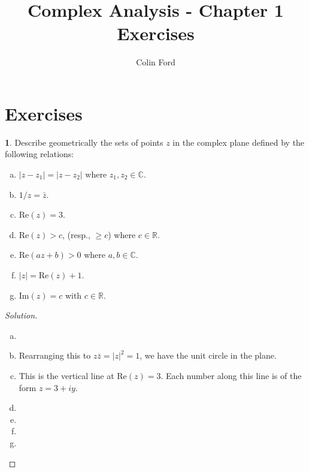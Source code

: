 \documentclass[12pt,a4]{article}
\author{Colin Ford}
\title{Complex Analysis - Chapter 1 Exercises}
\date{}
\theoremstyle{definition}
\newtheorem{exercise}{}
\renewcommand{\Re}{\text{Re}}
\renewcommand{\Im}{\text{Im}}
\newcommand{\C}{\mathbb{C}}
\newcommand{\R}{\mathbb{R}}
\begin{document}
\maketitle

\section*{Exercises}

\begin{exercise}
	Describe geometrically the sets of points $z$ in the complex plane defined by the following relations:
	
	\begin{enumerate}[(a)]
		\item $|z - z_1| = |z - z_2|$ where $z_1, z_2 \in \C$. 
		
		\item $1 / z = \bar{z}$. 
		
		\item $\Re(z) = 3$. 
		
		\item $\Re(z) > c$, (resp., $\geq c$) where $c \in \R$. 
		
		\item $\Re(a z + b) > 0$ where $a, b \in \C$. 
		
		\item $|z| = \Re(z) + 1$. 
		
		\item $\Im(z) = c$ with $c \in \R$.
	\end{enumerate}
\end{exercise}
\begin{proof}[Solution]
	\begin{enumerate}[(a)]
		\item 
		
		\item Rearranging this to $z \bar{z} = |z|^2 = 1$, we have the unit circle in the plane. 
		
		\item This is the vertical line at $\Re(z) = 3$. Each number along this line is of the form $z = 3 + i y$.
		
		\item 
		
		\item 
		
		\item 
		
		\item 
	\end{enumerate}
\end{proof}
\end{document}
